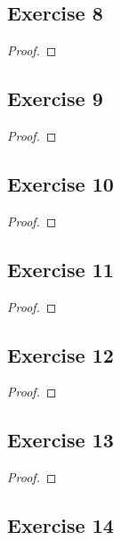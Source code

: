 \documentclass[14pt]{extarticle}
\begin{document}
\subsection{Exercise 8}

\begin{proof}

\end{proof}

\subsection{Exercise 9}

\begin{proof}

\end{proof}

\subsection{Exercise 10}

\begin{proof}

\end{proof}

\subsection{Exercise 11}

\begin{proof}

\end{proof}

\subsection{Exercise 12}

\begin{proof}

\end{proof}

\subsection{Exercise 13}

\begin{proof}

\end{proof}

\subsection{Exercise 14}
\end{document}
